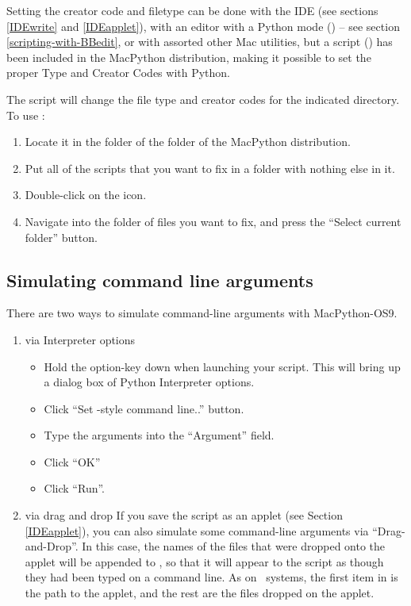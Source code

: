 Setting the creator code and filetype can be done with the IDE (see
sections \ref{IDEwrite} and \ref{IDEapplet}), with an editor with a
Python mode () -- see section
\ref{scripting-with-BBedit}, or with assorted other Mac utilities, but
a script () has been included in the MacPython
distribution, making it possible to set the proper Type and Creator
Codes with Python.

The  script will change the file type and
creator codes for the indicated directory.  To use
:

\begin{enumerate}
\item
Locate it in the  folder of the  folder of the
MacPython distribution.

\item
Put all of the scripts that you want to fix in a folder with nothing
else in it.

\item
Double-click on the  icon.

\item
Navigate into the folder of files you want to fix, and press the
``Select current folder'' button.
\end{enumerate}


\subsection{Simulating command line arguments
         \label{argv}}

There are two ways to simulate command-line arguments with MacPython-OS9.
 
\begin{enumerate}
\item via Interpreter options
\begin{itemize} %
  \item Hold the option-key down when launching your script. This will
        bring up a dialog box of Python Interpreter options.
  \item Click ``Set \UNIX-style command line..'' button. 
  \item Type the arguments into the ``Argument'' field.
  \item Click ``OK''
  \item Click ``Run''.
\end{itemize} %

\item via drag and drop
If you save the script as an applet (see Section \ref{IDEapplet}), you
can also simulate some command-line arguments via
``Drag-and-Drop''. In this case, the names of the files that were
dropped onto the applet will be appended to , so that
it will appear to the script as though they had been typed on a
command line.  As on \UNIX\ systems, the first item in  is
the path to the applet, and the rest are the files dropped on the
applet.
\end{enumerate}


